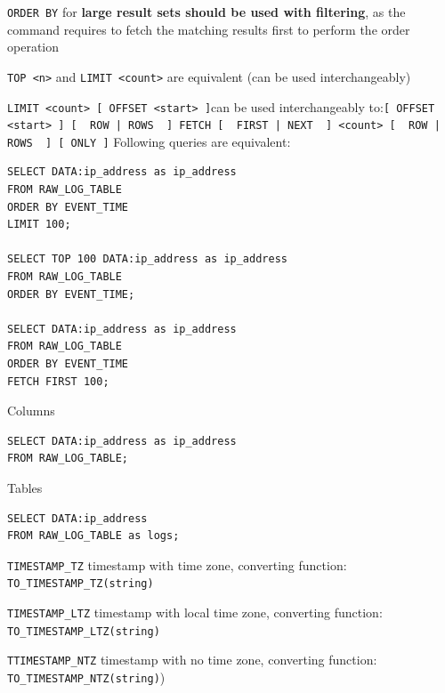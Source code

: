 \documentclass[9pt]{innovativeinnovation-cheatsheet}
\begin{document}
\begin{multicols}{3}
\small
\vspace{-18pt}
\bi{}
\item \texttt{ORDER BY} for \textbf{large result sets should be used with filtering}, as the command requires to fetch the matching results first to perform the order operation
\item \texttt{TOP <n>} and \texttt{LIMIT <count>} are equivalent (can be used interchangeably)
\item \texttt{LIMIT <count> [ OFFSET <start> ]}\newline can be used interchangeably to:\newline \texttt{[ OFFSET <start> ] [ { ROW | ROWS } ] FETCH [ { FIRST | NEXT } ] <count> [ { ROW | ROWS } ] [ ONLY ]}
\ei{}
Following queries are equivalent:
\scriptsize
\\[-18pt]
\begin{lstlisting}[style=code_style]
SELECT DATA:ip_address as ip_address
FROM RAW_LOG_TABLE
ORDER BY EVENT_TIME
LIMIT 100;

SELECT TOP 100 DATA:ip_address as ip_address
FROM RAW_LOG_TABLE
ORDER BY EVENT_TIME;

SELECT DATA:ip_address as ip_address
FROM RAW_LOG_TABLE
ORDER BY EVENT_TIME
FETCH FIRST 100;
\end{lstlisting}

\small
Columns
\\[-18pt]
\begin{lstlisting}[style=code_style]
SELECT DATA:ip_address as ip_address
FROM RAW_LOG_TABLE;
\end{lstlisting}
\small
Tables
\\[-18pt]
\begin{lstlisting}[style=code_style]
SELECT DATA:ip_address
FROM RAW_LOG_TABLE as logs;
\end{lstlisting}

\vspace{-18pt}
\bi{}
\item \texttt{TIMESTAMP\_TZ}  timestamp with time zone, converting function: \texttt{TO\_TIMESTAMP\_TZ(string)}
\item \texttt{TIMESTAMP\_LTZ}  timestamp with local time zone, converting function: \texttt{TO\_TIMESTAMP\_LTZ(string)}
\item \texttt{TTIMESTAMP\_NTZ}  timestamp with no time zone, converting function: \texttt{TO\_TIMESTAMP\_NTZ(string)})
\ei{}


\end{multicols}
\end{document}
